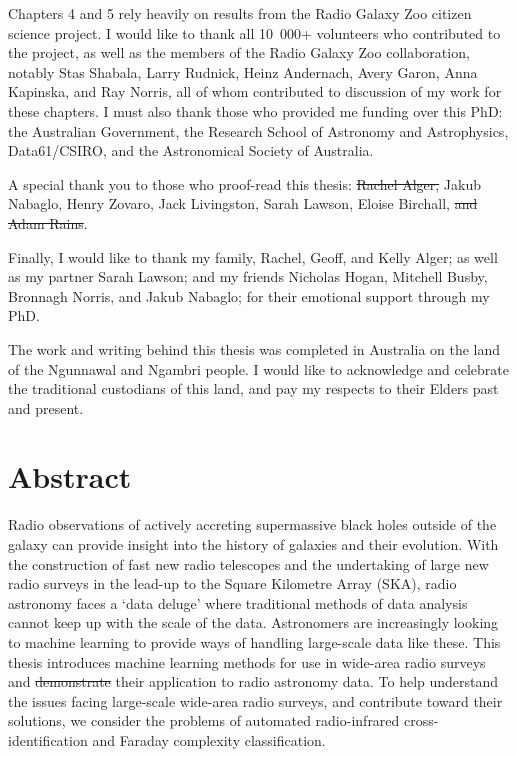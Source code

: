 \documentclass[11pt, a4paper]{book}
\providecommand{\DIFaddtex}[1]{{\protect\color{blue}\uwave{#1}}} %
\providecommand{\DIFdeltex}[1]{{\protect\color{red}\sout{#1}}}                      %
\providecommand{\DIFaddbegin}{} %
\providecommand{\DIFaddend}{} %
\providecommand{\DIFdelbegin}{} %
\providecommand{\DIFdelend}{} %
\providecommand{\DIFadd}[1]{\texorpdfstring{\DIFaddtex{#1}}{#1}} %
\providecommand{\DIFdel}[1]{\texorpdfstring{\DIFdeltex{#1}}{}} %
\newcommand{\DIFscaledelfig}{0.5}
\newlength{\DIFdelgraphicswidth} %
\newlength{\DIFdelgraphicsheight} %
\newcommand{\DIFaddincludegraphics}[2][]{{\color{blue}\fbox{\DIFOincludegraphics[#1]{#2}}}} %
\newcommand{\DIFdelincludegraphics}[2][]{%
\sbox{\DIFdelgraphicsbox}{\DIFOincludegraphics[#1]{#2}}%
\settoboxwidth{\DIFdelgraphicswidth}{\DIFdelgraphicsbox} %
\settoboxtotalheight{\DIFdelgraphicsheight}{\DIFdelgraphicsbox} %
\scalebox{\DIFscaledelfig}{%
\parbox[b]{\DIFdelgraphicswidth}{\usebox{\DIFdelgraphicsbox}\\[-\baselineskip] \rule{\DIFdelgraphicswidth}{0em}}\llap{\resizebox{\DIFdelgraphicswidth}{\DIFdelgraphicsheight}{%
\setlength{\unitlength}{\DIFdelgraphicswidth}%
\begin{picture}(1,1)%
\thicklines\linethickness{2pt} %
{\color[rgb]{1,0,0}\put(0,0){\framebox(1,1){}}}%
{\color[rgb]{1,0,0}\put(0,0){\line( 1,1){1}}}%
{\color[rgb]{1,0,0}\put(0,1){\line(1,-1){1}}}%
\end{picture}%
}\hspace*{3pt}}} %
} %
\DeclareRobustCommand{\DIFaddbegin}{\DIFOaddbegin \let\includegraphics\DIFaddincludegraphics} %
\DeclareRobustCommand{\DIFaddend}{\DIFOaddend \let\includegraphics\DIFOincludegraphics} %
\DeclareRobustCommand{\DIFdelbegin}{\DIFOdelbegin \let\includegraphics\DIFdelincludegraphics} %
\DeclareRobustCommand{\DIFdelend}{\DIFOaddend \let\includegraphics\DIFOincludegraphics} %
\begin{document}
Chapters 4 and 5 rely heavily on results from the Radio Galaxy Zoo citizen science project. I would like to thank all 10~000+ volunteers who contributed to the project, as well as the members of the Radio Galaxy Zoo collaboration, notably Stas Shabala, Larry Rudnick, Heinz Andernach, Avery Garon, Anna Kapinska, and Ray Norris, all of whom contributed to discussion of my work for these chapters. I must also thank those who provided me funding over this PhD: the Australian Government, the Research School of Astronomy and Astrophysics, Data61/CSIRO, and the Astronomical Society of Australia.

A special thank you to those who proof-read this thesis: \DIFdelbegin \DIFdel{Rachel Alger, }\DIFdelend Jakub Nabaglo, Henry Zovaro, Jack Livingston, Sarah Lawson, Eloise Birchall, \DIFdelbegin \DIFdel{and Adam Rains}\DIFdelend \DIFaddbegin \DIFadd{Adam Rains, and especially Rachel Alger}\DIFaddend .

Finally, I would like to thank my family, Rachel, Geoff, and Kelly Alger; as well as my partner Sarah Lawson; and my friends Nicholas Hogan, Mitchell Busby, Bronnagh Norris, and Jakub Nabaglo; for their emotional support through my PhD.

\clearpage

The work and writing behind this thesis was completed in Australia on the land of the Ngunnawal and Ngambri people. I would like to acknowledge and celebrate the traditional custodians of this land, and pay my respects to their Elders past and present.


\cleardoublepage
\pagestyle{headings}
\chapter*{Abstract}
\vspace{-1em}

Radio observations of actively accreting supermassive black holes outside of the galaxy can provide insight into the history of galaxies and their evolution. With the construction of fast new radio telescopes and the undertaking of large new radio surveys in the lead-up to the Square Kilometre Array (SKA), radio astronomy faces a `data deluge' where traditional methods of data analysis cannot keep up with the scale of the data. Astronomers are increasingly looking to machine learning to provide ways of handling large-scale data like these. This thesis introduces machine learning methods for use in wide-area radio surveys and \DIFdelbegin \DIFdel{demonstrate }\DIFdelend \DIFaddbegin \DIFadd{demonstrates }\DIFaddend their application to radio astronomy data. To help understand the issues facing large-scale wide-area radio surveys, and contribute toward their solutions, we consider the problems of automated radio-infrared cross-identification and Faraday complexity classification.
\end{document}

